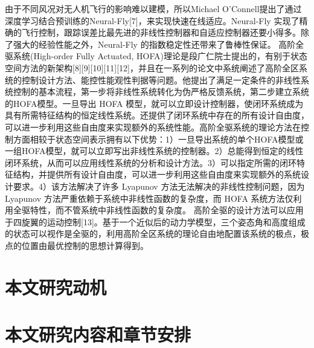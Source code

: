 由于不同风况对无人机飞行的影响难以建模，所以Michael O’Connell提出了通过深度学习结合预训练的Neural-Fly[7]，来实现快速在线适应。Neural-Fly 实现了精确的飞行控制，跟踪误差比最先进的非线性控制器和自适应控制器还要小得多。除了强大的经验性能之外，Neural-Fly 的指数稳定性还带来了鲁棒性保证。
高阶全驱系统(High-order Fully Actuated, HOFA)理论是段广仁院士提出的，有别于状态空间方法的新架构[8][9][10][11][12]，并且在一系列的论文中系统阐述了高阶全区系统的控制设计方法、能控性能观性判据等问题。他提出了满足一定条件的非线性系统控制的基本流程，第一步将非线性系统转化为伪严格反馈系统，第二步建立系统的HOFA模型。一旦导出 HOFA 模型，就可以立即设计控制器，使闭环系统成为具有所需特征结构的恒定线性系统。还提供了闭环系统中存在的所有设计自由度，可以进一步利用这些自由度来实现额外的系统性能。高阶全驱系统的理论方法在控制方面相较于状态空间表示拥有以下优势：1）一旦导出系统的单个HOFA模型或一组HOFA模型，就可以立即写出非线性系统的控制器。2）总能得到恒定的线性闭环系统，从而可以应用线性系统的分析和设计方法。3）可以指定所需的闭环特征结构，并提供所有设计自由度，可以进一步利用这些自由度来实现额外的系统设计要求。4）该方法解决了许多 Lyapunov 方法无法解决的非线性控制问题，因为 Lyapunov 方法严重依赖于系统中非线性函数的复杂度，而 HOFA 系统方法仅利用全驱特性，而不管系统中非线性函数的复杂度。
高阶全驱的设计方法可以应用于四旋翼的运动控制[13]。基于一个近似后的动力学模型，三个姿态角和高度组成的状态可以视作是全驱的，利用高阶全区系统的理论自由地配置该系统的极点，极点的位置由最优控制的思想计算得到。
\section{本文研究动机}
\section{本文研究内容和章节安排}